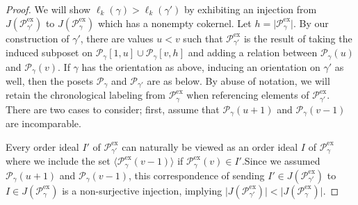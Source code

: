 \documentclass[12pt, letterpaper,table]{amsart}
\theoremstyle{remark}
\newcommand{\calP}{\mathcal{P}}
\newcommand{\highlight}[1]{\colorbox{gray!15}{\small{#1}}}
\newcommand{\exx}{\mathrm{ex}}
\begin{document}
\begin{proof}
We will show $\ell_k(\gamma) > \ell_k(\gamma')$ by exhibiting an injection from $J(\calP_{\gamma'}^\exx)$ to $J(\calP_\gamma^\exx)$ which has a nonempty cokernel. Let $h = \vert \calP_\gamma^\exx \vert$. By our construction of $\gamma'$, there are values $u < v$ such that $\calP_{\gamma'}^\exx$ is the result of taking the induced subposet on $\calP_\gamma[1,u] \cup \calP_\gamma[v,h]$ and adding a relation between $\calP_\gamma(u)$ and $\calP_\gamma(v)$. If $\gamma$ has the orientation as above, inducing an orientation on $\gamma'$ as well, then the posets $\calP_\gamma$ and $\calP_{\gamma'}$ are as below. By abuse of notation, we will retain the chronological labeling from $\calP_\gamma^\exx$ when referencing elements of $\calP_{\gamma'}^\exx$. There are two cases to consider; first, assume that $\calP_\gamma(u+1)$ and $\calP_\gamma(v-1)$ are incomparable. 



\begin{center}
\end{center}


 Every order ideal $I'$ of $\calP_{\gamma'}^\exx$ can naturally be viewed as an order ideal $I$ of $\calP_{\gamma}^\exx$ where we include the set $\langle \calP^\exx_{\gamma}(v-1)\rangle$ if $\calP^\exx_{\gamma}(v) \in I'$.Since we assumed  $\calP_\gamma(u+1)$ and $\calP_\gamma(v-1)$, this correspondence of sending $I' \in J(\calP_{\gamma'}^\exx)$ to $I \in J(\calP_{\gamma}^\exx)$ is a non-surjective injection, implying $\vert J(\calP_{\gamma'}^\exx) \vert < \vert J(\calP_{\gamma}^\exx) \vert$.


\end{proof}
\end{document}
